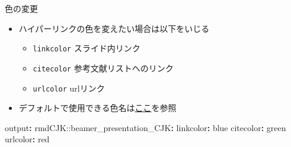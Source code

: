 \documentclass[
  12pt,
  ignorenonframetext,
]{beamer}
\newenvironment{Shaded}{\begin{snugshade}}{\end{snugshade}}
\newcommand{\AttributeTok}[1]{\textcolor[rgb]{0.77,0.63,0.00}{#1}}
\newcommand{\FunctionTok}[1]{\textcolor[rgb]{0.00,0.00,0.00}{#1}}
\newcommand{\KeywordTok}[1]{\textcolor[rgb]{0.13,0.29,0.53}{\textbf{#1}}}
\providecommand{\tightlist}{%
  \setlength{\itemsep}{0pt}\setlength{\parskip}{0pt}}
\begin{document}
\begin{frame}[fragile]{色の変更}
\protect\hypertarget{ux8272ux306eux5909ux66f4}{}

\begin{itemize}
\tightlist
\item
  ハイパーリンクの色を変えたい場合は以下をいじる

  \begin{itemize}
  \tightlist
  \item
    \texttt{linkcolor} スライド内リンク
  \item
    \texttt{citecolor} 参考文献リストへのリンク
  \item
    \texttt{urlcolor} urlリンク
  \end{itemize}
\item
  デフォルトで使用できる色名は\href{http://www.latex-cmd.com/style/color.html}{ここ}を参照
\end{itemize}

\begin{Shaded}
\begin{Highlighting}[]
\FunctionTok{output}\KeywordTok{:}
\AttributeTok{  rmdCJK:}\FunctionTok{:beamer_presentation_CJK}\KeywordTok{:}
\AttributeTok{    }\FunctionTok{linkcolor}\KeywordTok{:}\AttributeTok{ blue}
\AttributeTok{    }\FunctionTok{citecolor}\KeywordTok{:}\AttributeTok{ green}
\AttributeTok{    }\FunctionTok{urlcolor}\KeywordTok{:}\AttributeTok{ red}
\end{Highlighting}
\end{Shaded}

\end{frame}
\end{document}
